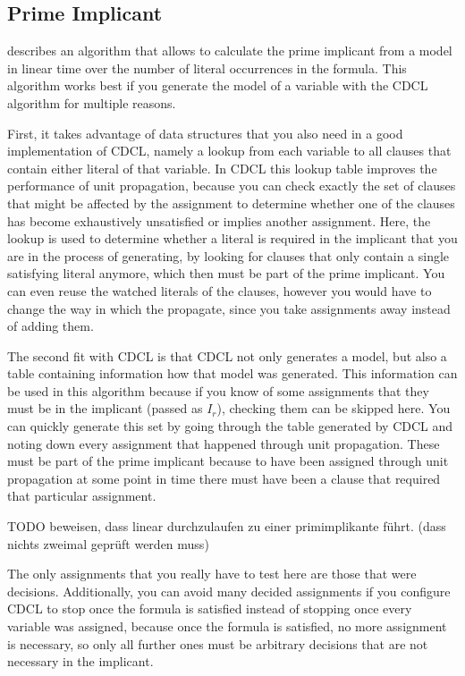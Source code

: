 \subsection{Prime Implicant}
\cite{dflbm13} describes an algorithm that allows to calculate the prime implicant from a model in linear time over the number of literal occurrences in the formula. This algorithm works best if you generate the model of a variable with the CDCL algorithm for multiple reasons.

First, it takes advantage of data structures that you also need in a good implementation of CDCL, namely a lookup from each variable to all clauses that contain either literal of that variable. In CDCL this lookup table improves the performance of unit propagation, because you can check exactly the set of clauses that might be affected by the assignment to determine whether one of the clauses has become exhaustively unsatisfied or implies another assignment. Here, the lookup is used to determine whether a literal is required in the implicant that you are in the process of generating, by looking for clauses that only contain a single satisfying literal anymore, which then must be part of the prime implicant. You can even reuse the watched literals of the clauses, however you would have to change the way in which the propagate, since you take assignments away instead of adding them.

The second fit with CDCL is that CDCL not only generates a model, but also a table containing information how that model was generated. This information can be used in this algorithm because if you know of some assignments that they must be in the implicant (passed as $I_r$), checking them can be skipped here. You can quickly generate this set by going through the table generated by CDCL and noting down every assignment that happened through unit propagation. These must be part of the prime implicant because to have been assigned through unit propagation at some point in time there must have been a clause that required that particular assignment. 

TODO beweisen, dass linear durchzulaufen zu einer primimplikante führt. (dass nichts zweimal geprüft werden muss)

The only assignments that you really have to test here are those that were decisions. Additionally, you can avoid many decided assignments if you configure CDCL to stop once the formula is satisfied instead of stopping once every variable was assigned, because once the formula is satisfied, no more assignment is necessary, so only all further ones must be arbitrary decisions that are not necessary in the implicant. 

